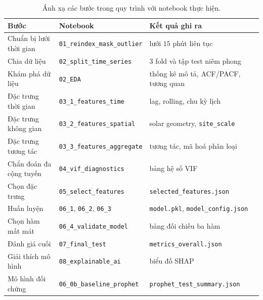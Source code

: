 \documentclass[12pt, a4paper]{report}
\begin{document}
\begin{table}[htbp]
\centering

\footnotesize
\renewcommand{\baselinestretch}{1.0}\selectfont
\begin{tabular}{@{}p{3.4cm} p{4.6cm} p{5.4cm}@{}}
\toprule
\textbf{Bước} & \textbf{Notebook} & \textbf{Kết quả ghi ra} \\
\midrule
Chuẩn bị lưới thời gian & \texttt{01\_reindex\_mask\_outlier} & lưới $15$ phút liên tục \\
Chia dữ liệu & \texttt{02\_split\_time\_series} & $3$ fold và tập test niêm phong \\
Khám phá dữ liệu & \texttt{02\_EDA} & thống kê mô tả, ACF/PACF, tương quan \\
Đặc trưng thời gian & \texttt{03\_1\_features\_time} & lag, rolling, chu kỳ lịch \\
Đặc trưng không gian & \texttt{03\_2\_features\_spatial} & solar geometry, \texttt{site\_scale} \\
Đặc trưng tương tác & \texttt{03\_3\_features\_aggregate} & tương tác, mã hoá phân loại \\
Chẩn đoán đa cộng tuyến & \texttt{04\_vif\_diagnostics} & bảng hệ số VIF \\
Chọn đặc trưng & \texttt{05\_select\_features} & \texttt{selected\_features.json} \\
Huấn luyện & \texttt{06\_1}, \texttt{06\_2}, \texttt{06\_3} & \texttt{model.pkl}, \texttt{model\_config.json} \\
Chọn hàm mất mát & \texttt{06\_4\_validate\_model} & bảng đối chiếu ba hàm \\
Đánh giá cuối & \texttt{07\_final\_test} & \texttt{metrics\_overall.json} \\
Giải thích mô hình & \texttt{08\_explainable\_ai} & biểu đồ SHAP \\
Mô hình đối chứng & \texttt{06\_0b\_baseline\_prophet} & \texttt{prophet\_test\_summary.json} \\
\bottomrule
\end{tabular}
\caption{Ánh xạ các bước trong quy trình với notebook thực hiện.}
\label{tab:notebook_pipeline}
\end{table}
\end{document}
